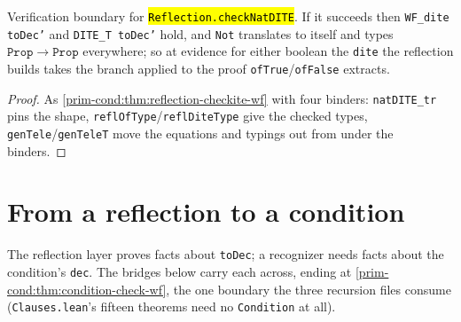 \begin{theorem}
  \label{prim-cond:thm:reflection-checknatdite-wf}
  \leanok

   Verification boundary for \hl{\texttt{Reflection.checkNatDITE}}.
  If it succeeds then \texttt{WF\_dite toDec'} and \texttt{DITE\_T toDec'} hold, and \texttt{Not}
  translates to itself and types $\mathtt{Prop} \to \mathtt{Prop}$ everywhere; so at evidence for
  either boolean the \texttt{dite} the reflection builds takes the branch applied to the proof
  \texttt{ofTrue}/\texttt{ofFalse} extracts.
\end{theorem}
\begin{proof}
  \leanok
   As \ref{prim-cond:thm:reflection-checkite-wf} with four binders: \texttt{natDITE\_tr}
  pins the shape, \texttt{reflOfType}/\texttt{reflDiteType} give the checked types,
  \texttt{genTele}/\texttt{genTeleT} move the equations and typings out from under the binders.
\end{proof}

\section{From a reflection to a condition}

The reflection layer proves facts about \texttt{toDec}; a recognizer needs facts about the
condition's \texttt{dec}. The bridges below carry each across, ending at
\ref{prim-cond:thm:condition-check-wf}, the one boundary the three recursion files consume
(\texttt{Clauses.lean}'s fifteen theorems need no \texttt{Condition} at all).

